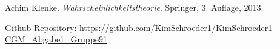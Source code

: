 \documentclass[a4paper,12pt]{article}
\begin{document}
\newpage
\renewcommand{\refname}{Literatur}
\begin{thebibliography}{9}
     \hypertarget{source1}{} Achim Klenke. \textit{Wahrscheinlichkeitstheorie}. Springer, 3. Auflage, 2013.
   
\end{thebibliography}
Github-Repository: \url{https://github.com/KimSchroeder1/KimSchroeder1-CGM_Abgabe1_Gruppe91}
\end{document}
